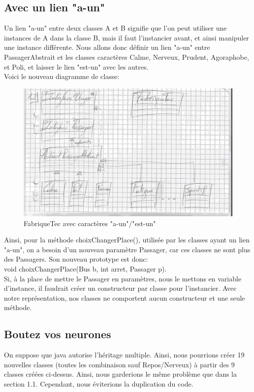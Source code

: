 \documentclass[a4paper,11pt]{article}
\begin{document}
\subsection{Avec un lien "a-un"}
Un lien "a-un" entre deux classes A et B signifie que l'on peut utiliser une instances de A dans la classe B, mais il faut l'instancier avant, et ainsi manipuler une instance différente.
Nous allons donc définir un lien "a-un" entre PassagerAbstrait et les classes caractères Calme, Nerveux, Prudent, Agoraphobe, et Poli, et laisser le lien "est-un" avec les autres.\\
Voici le nouveau diagramme de classe:
\newpage
\begin{figure}[!h]
  \begin{center}
    \caption{FabriqueTec avec caractères "a-un"/"est-un"}
    \includegraphics[scale=0.1]{Diag2.jpg}
  \end{center}
\end{figure}

Ainsi, pour la méthode choixChangerPlace(), utilisée par les classes ayant un lien "a-un", on a besoin d'un nouveau paramètre Passager, car ces classes ne sont plus des Passagers. Son nouveau prototype est donc:\\
void choixChangerPlace(Bus b, int arret, Passager p).\\
Si, à la place de mettre le Passager en paramètres, nous le mettons en variable d'instance, il faudrait créer un constructeur par classe pour l'instancier. Avec notre représentation, nos classes ne comportent aucun constructeur et une seule méthode.
\subsection{Boutez vos neurones}
On suppose que java autorise l'héritage multiple.
Ainsi, nous pourrions créer 19 nouvelles classes (toutes les combinaison sauf Repos/Nerveux) à partir des 9 classes créées ci-dessus. Ainsi, nous garderions le même problème que dans la section 1.1. Cependant, nous éviterions la duplication du code.
\end{document}
